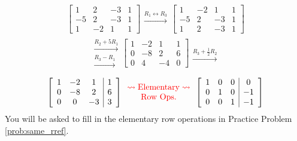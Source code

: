 \documentclass{ximera}
\begin{document}
\begin{exploration}
$$\left[\begin{array}{ccc|c}  
 1&2&-3&1\\-5&2&-3&1\\1&-2&1&1
 \end{array}\right]
 \begin{array}{c}
 \\
 \xrightarrow{R_1\leftrightarrow R_3}\\
\\
 \end{array}
\left[\begin{array}{ccc|c}  
 1&-2&1&1\\-5&2&-3&1\\1&2&-3&1
 \end{array}\right]$$
$$\begin{array}{c}
 \\
 \xrightarrow{R_2+5R_1}\\
 \xrightarrow{R_3-R_1}\\
 \end{array}
\left[\begin{array}{ccc|c}  
 1&-2&1&1\\0&-8&2&6\\0&4&-4&0
 \end{array}\right]
 \begin{array}{c}
 \\
 \\
 \xrightarrow{R_3+\frac{1}{2}R_2}\\
 \end{array}
$$
\begin{equation*}
  \left[\begin{array}{ccc|c}  
 1&-2&1&1\\0&-8&2&6\\0&0&-3&3
 \end{array}\right]
 \color{red}
 \begin{array}{c}
\rightsquigarrow\text{Elementary}\rightsquigarrow\\
\text{Row Ops.}
\end{array}
 \color{black}
  \left[\begin{array}{ccc|c}  
 1&0&0&0\\0&1&0&-1\\0&0&1&-1
 \end{array}\right]
\end{equation*}
You will be asked to fill in the elementary row operations in Practice Problem \ref{prob:same_rref}.
\end{exploration}
\end{document}
